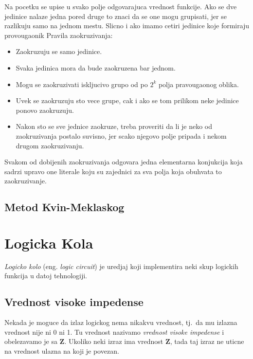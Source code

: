 \documentclass[12p,a4paper]{article}
\begin{document}
\begin{multicols}{2}
    Na pocetku se upise u svako polje odgovarajuca vrednost funkcije.
    Ako se dve jedinice nalaze jedna pored druge to znaci da se one mogu 
    grupisati, jer se razlikuju samo na jednom mestu.
    Slicno i ako imamo cetiri jedinice koje formiraju provougaonik
    Pravila zaokruzivanja:
    \begin{itemize}
        \itemsep0em
        \item Zaokruzuju se samo jedinice.
        \item Svaka jedinica mora da bude zaokruzena bar jednom.
        \item Mogu se zaokruzivati iskljucivo grupo od po $2^k$ polja 
              pravougaonog oblika.
        \item Uvek se zaokruzuju sto vece grupe, cak i ako se tom prilikom 
              neke jedinice ponovo zaokruzuju.
        \item Nakon sto se sve jednice zaokruze, treba proveriti da li je neko 
              od zaokruzivanja postalo suvisno, jer scako njegovo polje 
              pripada i nekom drugom zaokruzivanju.
    \end{itemize}

    Svakom od dobijenih zaokruzivanja odgovara jedna elementarna konjukcija
    koja sadrzi upravo one literale koju su zajednici za sva polja koja 
    obuhvata to zaokruzivanje.

    \subsection{Metod Kvin-Meklaskog}
    
    \section{Logicka Kola}
    
    \emph{Logicko kolo} (eng. \emph{logic circuit}) je uredjaj koji 
    implementira neki skup logickih funkcija u datoj tehnologiji.

    \subsection{Vrednost visoke impedense}
    
    Nekada je moguce da izlaz logickog nema nikakvu vrednost, tj.\ da mu
    izlazna vrednost nije ni 0 ni 1. Tu vrednost nazivamo 
    \emph{vrednost visoke impedense} i obelezavamo je sa $\mathbf{Z}$. Ukoliko
    neki izraz ima vrednost $\mathbf{Z}$, tada taj izraz ne uticne na vrednost 
    ulazna na koji je povezan.


\end{multicols}
\end{document}
